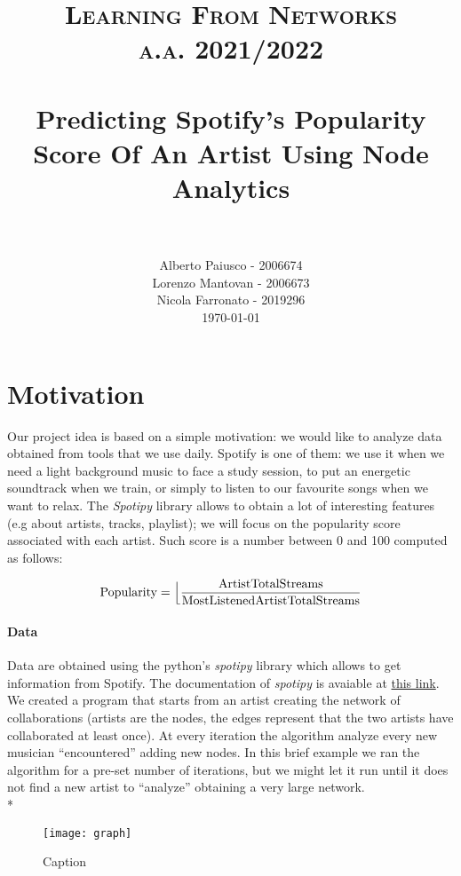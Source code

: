 \documentclass[paper=a4, fontsize=11pt]{scrartcl}
\title{
		\usefont{OT1}{bch}{b}{n}
		\normalfont \normalsize \textsc{\textcolor{NavyBlue}{Learning From Networks}} \\ [1pt]
		\normalfont \normalsize \textsc{\textcolor{NavyBlue}{a.a. 2021/2022}} \\ [10pt]
		\horrule{0.5pt} \\[0.4cm]
		\huge \textcolor{NavyBlue}{Predicting Spotify’s Popularity Score Of An Artist Using Node Analytics} \\
		\horrule{2pt} \\[0.2cm]
}
\author{
		\normalfont 								\normalsize
        Alberto Paiusco - 2006674\\[-3pt]		\normalsize
        \normalfont 								\normalsize
        Lorenzo Mantovan - 2006673\\[-3pt]		\normalsize
        \normalfont 								\normalsize
        Nicola Farronato - 2019296\\[-3pt]		\normalsize
        \today
}
\date{}
\numberwithin{equation}{section}		%
\numberwithin{figure}{section}			%
\numberwithin{table}{section}			%
\begin{document}
\maketitle

\section*{\textcolor{NavyBlue}{Motivation}}
 Our project idea is based on a simple motivation: we would like to analyze data obtained from tools that we use daily. Spotify is one of them: we use it when we need a light background music to face a study session, to put an energetic soundtrack when we train, or simply to listen to our favourite songs when we want to relax. The \textit{Spotipy} library allows to obtain a lot of interesting features (e.g about artists, tracks, playlist); we will focus on the popularity score associated with each artist. Such score is a number between 0 and 100 computed as follows:

$$\text{Popularity}= \Bigl\lfloor  \frac{\text{ArtistTotalStreams}}{\text{MostListenedArtistTotalStreams}} $$ 



\paragraph{\textbf{\textcolor{NavyBlue}{Data}}}
Data are obtained using the python’s \textit{spotipy} library which allows to get information
from Spotify. The documentation of \textit{spotipy} is avaiable at \href{https://spotipy.readthedocs.io/en/2.19.0/}{this link}. We created a program that starts from an artist creating the network of collaborations (artists are the nodes, the edges represent that the two artists have collaborated at least once). At every iteration the algorithm analyze every new musician “encountered” adding new nodes. In this brief example we ran the algorithm for a pre-set number of iterations, but we might let it run until it does not find a new artist to “analyze” obtaining a very large network.\\*

\begin{figure}[ht]
    \centering
    \texttt{[image: graph]}
    \caption{Caption}
    \label{fig:my_label}
\end{figure}
\end{document}

